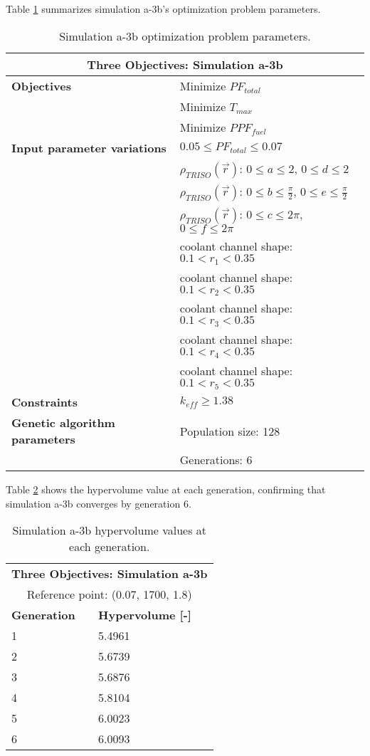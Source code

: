 Table \ref{tab:simulationa3b} summarizes simulation a-3b's optimization problem parameters. 
\begin{table}[htbp!]
    \centering
    \onehalfspacing
    \caption{Simulation a-3b optimization problem parameters.}
	\label{tab:simulationa3b}
    \footnotesize
    \begin{tabular}{l|p{6.5cm}}
    \hline 
    \multicolumn{2}{c}{\textbf{Three Objectives: Simulation a-3b}} \\
    \hline 
    \textbf{Objectives} & Minimize $PF_{total}$ \\
    & Minimize $T_{max}$ \\
    & Minimize $PPF_{fuel}$ \\
    \hline 
    \textbf{Input parameter variations} & $0.05 \leq PF_{total} \leq 0.07$ \\
    & $\rho_{TRISO}(\vec{r})$: $0 \leq a \leq 2$, $0 \leq d \leq 2$\\
    & $\rho_{TRISO}(\vec{r})$: $0 \leq b \leq \frac{\pi}{2}$, $0 \leq e \leq \frac{\pi}{2}$\\
    & $\rho_{TRISO}(\vec{r})$: $0 \leq c \leq 2\pi$, $0 \leq f \leq 2\pi$\\
    & coolant channel shape: $0.1<r_{1}<0.35$ \\
    & coolant channel shape: $0.1<r_{2}<0.35$ \\
    & coolant channel shape: $0.1<r_{3}<0.35$ \\
    & coolant channel shape: $0.1<r_{4}<0.35$ \\
    & coolant channel shape: $0.1<r_{5}<0.35$ \\
    \hline
    \textbf{Constraints} & $k_{eff} \geq 1.38$\\ 
    \hline 
    \textbf{Genetic algorithm parameters} & Population size: 128 \\
    & Generations: 6 \\
    \hline
    \end{tabular}
\end{table}
Table \ref{tab:a3b-hypervolume} shows the hypervolume value at each generation, 
confirming that simulation a-3b converges by generation 6. 
\begin{table}[htbp!]
    \centering
    \onehalfspacing
    \caption{Simulation a-3b hypervolume values at each generation.}
	\label{tab:a3b-hypervolume}
    \footnotesize
    \begin{tabular}{ll}
    \hline 
    \multicolumn{2}{c}{\textbf{Three Objectives: Simulation a-3b}} \\
    \multicolumn{2}{c}{Reference point: (0.07, 1700, 1.8)} \\
    \hline 
    \textbf{Generation} & \textbf{Hypervolume [-]} \\
    \hline
    1 & 5.4961 \\
    2 & 5.6739 \\
    3 & 5.6876 \\
    4 & 5.8104 \\
    5 & 6.0023 \\
    6 & 6.0093 \\
    \hline
    \end{tabular}
\end{table}

